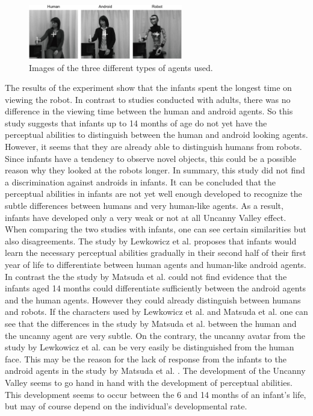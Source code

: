 \begin{figure} %
    \centering
    \includegraphics[width=0.6\textwidth]{graphics/uncanny_infants_discrimination.png}
    \caption{Images of the three different types of agents used.}
    \label{fig:uncannyInfantsDiscrimination}
\end{figure}
The results of the experiment show that the infants spent the longest time on viewing the robot. In contrast to studies conducted with adults, there was no difference in the viewing time between the human and android agents. So this study suggests that infants up to 14 months of age do not yet have the perceptual abilities to distinguish between the human and android looking agents. However, it seems that they are already able to distinguish humans from robots. Since infants have a tendency to observe novel objects, this could be a possible reason why they looked at the robots longer. In summary, this study did not find a discrimination against androids in infants. It can be concluded that the perceptual abilities in infants are not yet well enough developed to recognize the subtle differences between humans and very human-like agents. As a result, infants have developed only a very weak or not at all Uncanny Valley effect. \cite{uncanny_infant_discrimination}\\
When comparing the two studies with infants, one can see certain similarities but also disagreements. The study by Lewkowicz et al. \cite{uncanny_infants} proposes that infants would learn the necessary perceptual abilities gradually in their second half of their first year of life to differentiate between human agents and human-like android agents. In contrast the the study by Matsuda et al. \cite{uncanny_infant_discrimination} could not find evidence that the infants aged 14 months could differentiate sufficiently between the android agents and the human agents. However they could already distinguish between humans and robots. If the characters used by Lewkowicz et al. and Matsuda et al. one can see that the differences in the study by Matsuda et al. between the human and the uncanny agent are very subtle. On the contrary, the uncanny avatar from the study by Lewkowicz et al.  can be very easily be distinguished from the human face. This may be the reason for the lack of response from the infants to the android agents in the study by Matsuda et al. . The development of the Uncanny Valley seems to go hand in hand with the development of perceptual abilities. This development seems to occur between the 6 and 14 months of an infant's life, but may of course depend on the individual's developmental rate. 




